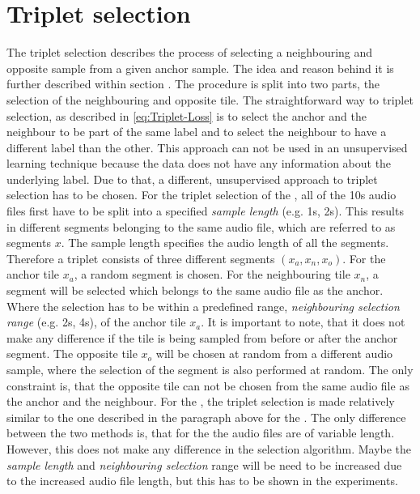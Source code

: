 \section{Triplet selection}
\label{sec:Triplet-Selection}
The triplet selection describes the process of selecting a neighbouring and opposite sample from a given anchor sample. The idea and reason behind it is further described within section . The procedure is split into two parts, the selection of the neighbouring and opposite tile.
\newline
\newline
The straightforward way to triplet selection, as described in \ref{eq:Triplet-Loss} is to select the anchor and the neighbour to be part of the same label and to select the neighbour to have a different label than the other. This approach can not be used in an unsupervised learning technique because the data does not have any information about the underlying label. Due to that, a different, unsupervised approach to triplet selection has to be chosen.
\newline
\newline
For the triplet selection of the , all of the 10s audio files first have to be split into a specified \textit{sample length} (e.g. 1s, 2s). This results in different segments belonging to the same audio file, which are referred to as segments $x$. The sample length specifies the audio length of all the segments. Therefore a triplet consists of three different segments $(x_a, x_n, x_o)$.
\newline
For the anchor tile $x_a$, a random segment is chosen. For the neighbouring tile $x_n$, a segment will be selected which belongs to the same audio file as the anchor. Where the selection has to be within a predefined range, \textit{neighbouring selection range} (e.g. 2s, 4s), of the anchor tile $x_a$. It is important to note, that it does not make any difference if the tile is being sampled from before or after the anchor segment. The opposite tile $x_o$ will be chosen at random from a different audio sample, where the selection of the segment is also performed at random. The only constraint is, that the opposite tile can not be chosen from the same audio file as the anchor and the neighbour.
\newline
\newline
For the , the triplet selection is made relatively similar to the one described in the paragraph above for the . The only difference between the two methods is, that for the  the audio files are of variable length. However, this does not make any difference in the selection algorithm. Maybe the \textit{sample length} and \textit{neighbouring selection} range will be need to be increased due to the increased audio file length, but this has to be shown in the experiments.

